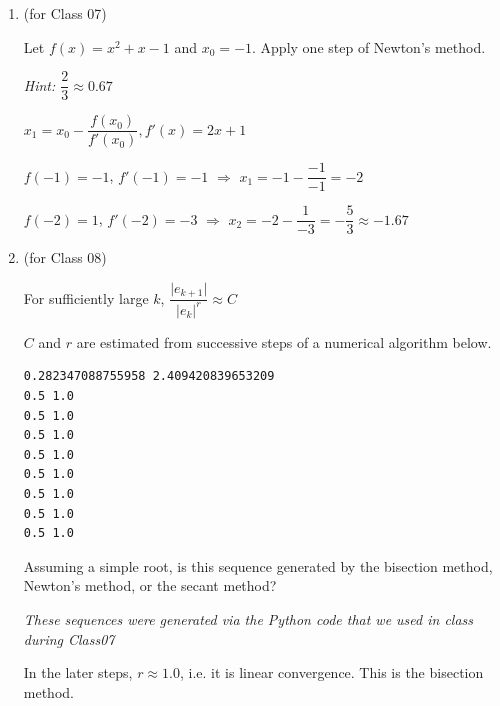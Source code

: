\documentclass[12pt,letterpaper,answers]{exam}
\begin{document}
\begin{enumerate}
\item (for Class 07)






Let $f(x) = x^2 + x - 1$ and $x_0 = -1$.  Apply one step of Newton's method.

\emph{Hint: $\dfrac{2}{3}\approx0.67$}

\begin{solution}
$x_1 = x_0 - \dfrac{f(x_0)}{f'(x_0)}, f'(x) = 2x+1$  

$f(-1) = -1$, $f'(-1) = -1$ $\Longrightarrow$  $x_1 = -1 - \dfrac{-1}{-1} = -2$

$f(-2) = 1$, $f'(-2) = -3$ $\Longrightarrow$  $x_2 = -2 - \dfrac{1}{-3} = -\dfrac{5}{3} \approx-1.67$
\end{solution}

\item (for Class 08)

For sufficiently large $k$, $\dfrac{\vert e_{k+1}\vert}{\vert e_k\vert^r} \approx C$

$C$ and $r$ are estimated from successive steps of a numerical algorithm below.

\begin{verbatim}
0.282347088755958 2.409420839653209
0.5 1.0
0.5 1.0
0.5 1.0
0.5 1.0
0.5 1.0
0.5 1.0
0.5 1.0
0.5 1.0
\end{verbatim}

Assuming a simple root, is this sequence generated by the bisection method, Newton's method, or the secant method?

\emph{These sequences were generated via the Python code that we used in class during Class07}

\begin{solution}
In the later steps, $r\approx 1.0$, i.e. it is linear convergence.  This is the bisection method.
\end{solution}


\end{enumerate}
\end{document}
